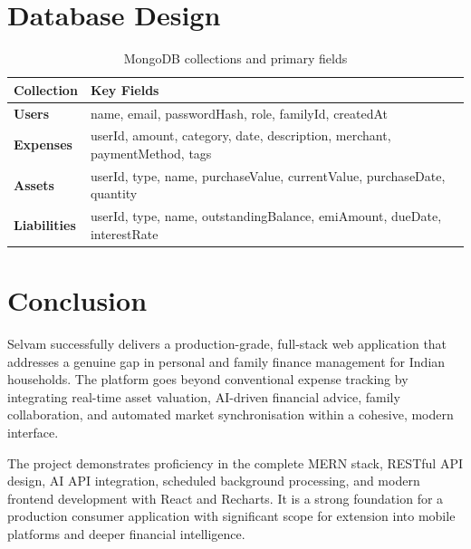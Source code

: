 \documentclass[12pt,a4paper]{article}
\begin{document}
\section{Database Design}

\begin{table}[H]
\centering
\begin{tabularx}{\linewidth}{>{\bfseries}l X}
\toprule
Collection & Key Fields \\
\midrule
Users       & name, email, passwordHash, role, familyId, createdAt \\
Expenses    & userId, amount, category, date, description, merchant, paymentMethod, tags \\
Assets      & userId, type, name, purchaseValue, currentValue, purchaseDate, quantity \\
Liabilities & userId, type, name, outstandingBalance, emiAmount, dueDate, interestRate \\
\bottomrule
\end{tabularx}
\caption{MongoDB collections and primary fields}
\end{table}

\section{Conclusion}

Selvam successfully delivers a production-grade, full-stack web application that addresses a genuine gap in personal and family finance management for Indian households. The platform goes beyond conventional expense tracking by integrating real-time asset valuation, AI-driven financial advice, family collaboration, and automated market synchronisation within a cohesive, modern interface.

The project demonstrates proficiency in the complete MERN stack, RESTful API design, AI API integration, scheduled background processing, and modern frontend development with React and Recharts. It is a strong foundation for a production consumer application with significant scope for extension into mobile platforms and deeper financial intelligence.

\end{document}
